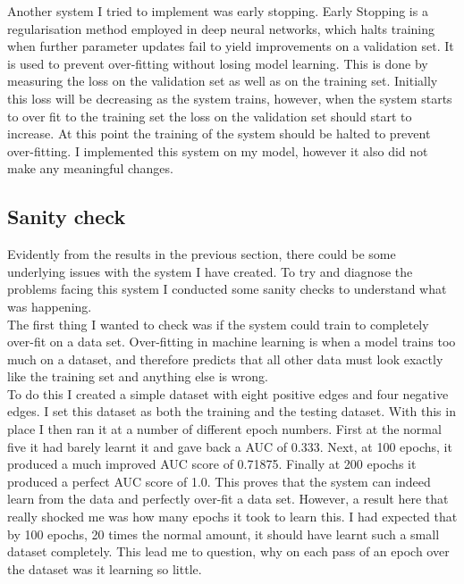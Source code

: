 \documentclass{l4proj}
\begin{document}
Another system I tried to implement was early stopping. Early Stopping is a regularisation method employed in deep neural networks, which halts training when further parameter updates fail to yield improvements on a validation set. It is used to prevent over-fitting without losing model learning. This is done by measuring the loss on the validation set as well as on the training set. Initially this loss will be decreasing as the system trains, however, when the system starts to over fit to the training set the loss on the validation set should start to increase. At this point the training of the system should be halted to prevent over-fitting. I implemented this system on my model, however it also did not make any meaningful changes. \\
\subsection{Sanity check}

Evidently from the results in the previous section, there could be some underlying issues with the system I have created. To try and diagnose the problems facing this system I conducted some sanity checks to understand what was happening. \\

The first thing I wanted to check was if the system could train to completely over-fit on a data set. Over-fitting in machine learning is when a model trains too much on a dataset, and therefore predicts that all other data must look exactly like the training set and anything else is wrong. \\

To do this I created a simple dataset with eight positive edges and four negative edges. I set this dataset as both the training and the testing dataset. With this in place I then ran it at a number of different epoch numbers. First at the normal five it had barely learnt it and gave back a AUC of 0.333. Next, at 100 epochs, it produced a much improved AUC score of 0.71875. Finally at 200 epochs it produced a perfect AUC score of 1.0. This proves that the system can indeed learn from the data and perfectly over-fit a data set. However, a result here that really shocked me was how many epochs it took to learn this. I had expected that by 100 epochs, 20 times the normal amount, it should have learnt such a small dataset completely. This lead me to question, why on each pass of an epoch over the dataset was it learning so little. \\
\end{document}
